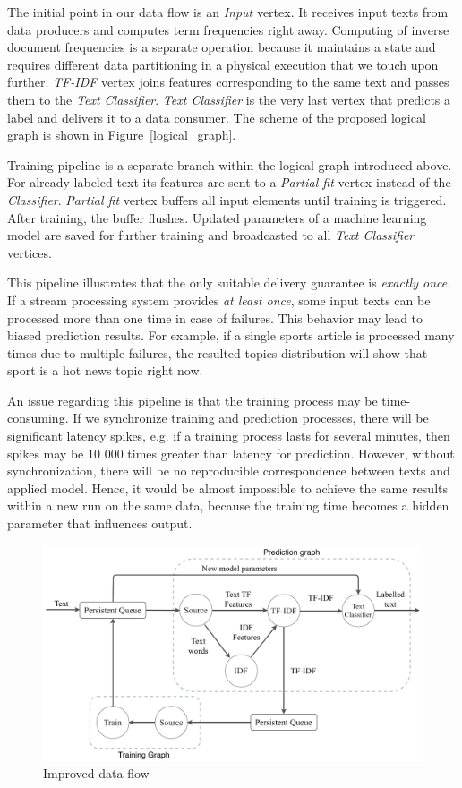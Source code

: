 The initial point in our data flow is an {\em Input} vertex. It receives input texts from data producers and computes term frequencies right away. Computing of inverse document frequencies is a separate operation because it maintains a state and requires different data partitioning in a physical execution that we touch upon further. {\em TF-IDF} vertex joins features corresponding to the same text and passes them to the {\em Text Classifier}. {\em Text Classifier} is the very last vertex that predicts a label and delivers it to a data consumer. The scheme of the proposed logical graph is shown in Figure~\ref{logical_graph}.

Training pipeline is a separate branch within the logical graph introduced above. For already labeled text its features are sent to a {\em Partial fit} vertex instead of the {\em Classifier}. {\em Partial fit} vertex buffers all input elements until training is triggered. After training, the buffer flushes. Updated parameters of a machine learning model are saved for further training and broadcasted to all {\em Text Classifier} vertices.

This pipeline illustrates that the only suitable delivery guarantee is {\em exactly once}. If a stream processing system provides {\em at least once}, some input texts can be processed more than one time in case of failures. This behavior may lead to biased prediction results. For example, if a single sports article is processed many times due to multiple failures, the resulted topics distribution will show that sport is a hot news topic right now.

An issue regarding this pipeline is that the training process may be time-consuming. If we synchronize training and prediction processes, there will be significant latency spikes, e.g. if a training process lasts for several minutes, then spikes may be 10 000 times greater than latency for prediction. However, without synchronization, there will be no reproducible correspondence between texts and applied model. Hence, it would be almost impossible to achieve the same results within a new run on the same data, because the training time becomes a hidden parameter that influences output.

\begin{figure}[htbp]
  \centering
  \includegraphics[scale=0.300]{pics/pipeline}
  \caption{Improved data flow}
  \label {pipeline}
\end{figure}

